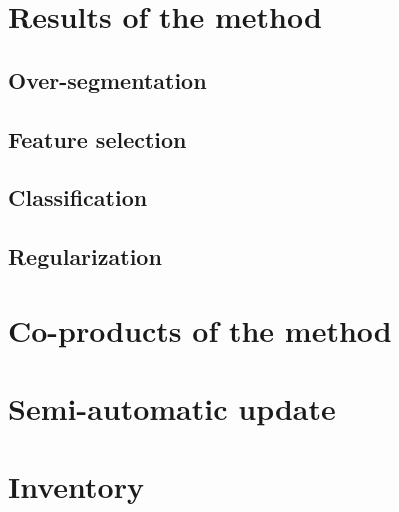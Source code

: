 \section{Results of the method}
\subsection{Over-segmentation}
\subsection{Feature selection}
\subsection{Classification}
\subsection{Regularization}
\section{Co-products of the method}
\section{Semi-automatic update}
\section{Inventory}




\stopcontents[chapters]